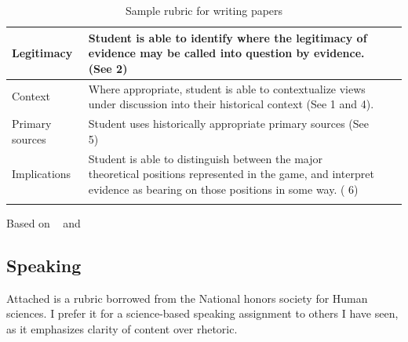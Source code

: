 \begin{refsection}
\begin{longtable}[!t]{ | P{2cm} | P{3.5cm} | P{3.5cm} | P{3.5cm} |}
Legitimacy&Student is able to identify where the legitimacy of evidence may be called into question by evidence.  (See  2) \\ \hline

Context&Where appropriate, student is able to contextualize views under discussion into their historical context (See  1 and 4). \\ \hline

Primary sources&Student uses historically appropriate primary sources (See  5) \\ \hline

Implications&Student is able to distinguish between the major theoretical positions represented in the game, and interpret evidence as bearing on those positions in some way. ( 6)\\ \hline
\caption{Sample rubric for writing papers}
\label{table: speakingrubric}
\end{longtable}


Based on ~\citep{Clabough:uw} and ~\citep{Dawn:wh}

\subsection{Speaking}
\label{speaking}

Attached is a rubric borrowed from the National honors society for Human sciences. I prefer it for a science-based speaking assignment to others I have seen, as it emphasizes clarity of content over rhetoric.


\end{refsection}
